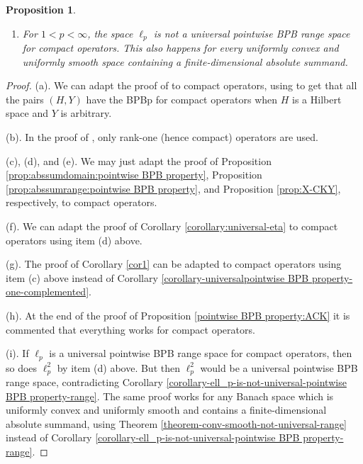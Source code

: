 \documentclass[a4paper,10pt]{amsart}
\theoremstyle{plain}
\newtheorem{proposition}[theorem]{Proposition}
\theoremstyle{definition}
\begin{document}
\begin{proposition}
\begin{enumerate}
\begin{itemize}
\item Banach spaces with property $\beta$;
\item finite $\ell_\infty$-sums of Banach spaces with ACK$_\rho$-structure;
\item finite injective tensor products of spaces with ACK$_\rho$-structure;
\item $c_0(Y)$, $\ell_\infty(Y)$ and $c_0(Y,w)$ (the space of weakly-null sequences of $Y$) when $Y$ has ACK$_\rho$-structure;
\item $C(K,Y)$ and $C_w(K,Y)$ when $Y$ has ACK$_\rho$-structure.
\end{itemize}
\item[(i)] For $1< p<\infty$, the space $\ell_p$ is not a universal pointwise BPB range space for compact operators. This also happens for every uniformly convex and uniformly smooth space containing a finite-dimensional absolute summand.
\end{enumerate}
\end{proposition}


\begin{proof}
(a). We can adapt the proof of \cite[Theorem 2.5]{DKL} to compact operators, using \cite[Example 1.5.(b)]{DGMM} to get that all the pairs $(H,Y)$ have the BPBp for compact operators when $H$ is a Hilbert space and $Y$ is arbitrary.

(b). In the proof of \cite[Proposition 2.3]{DKL}, only rank-one (hence compact) operators are used.

(c), (d), and (e). We may just adapt the proof of Proposition \ref{prop:abssumdomain:pointwise BPB property}, Proposition \ref{prop:abssumrange:pointwise BPB property}, and Proposition \ref{prop:X-CKY}, respectively, to compact operators.

(f). We can adapt the proof of Corollary \ref{corollary:universal-eta} to compact operators using item (d) above.

(g). The proof of Corollary \ref{cor1} can be adapted to compact operators using item (c) above instead of Corollary \ref{corollary-universalpointwise BPB property-one-complemented}.

(h). At the end of the proof of Proposition \ref{pointwise BPB property:ACK} it is commented that everything works for compact operators.

(i). If $\ell_p$ is a universal pointwise BPB range space for compact operators, then so does $\ell_p^2$ by item (d) above. But then $\ell_p^2$ would be a universal pointwise BPB range space, contradicting Corollary \ref{corollary-ell_p-is-not-universal-pointwise BPB property-range}. The same proof works for any Banach space which is uniformly convex and uniformly smooth and contains a finite-dimensional absolute summand, using Theorem \ref{theorem-conv-smooth-not-universal-range} instead of Corollary \ref{corollary-ell_p-is-not-universal-pointwise BPB property-range}.
\end{proof}
\end{document}
